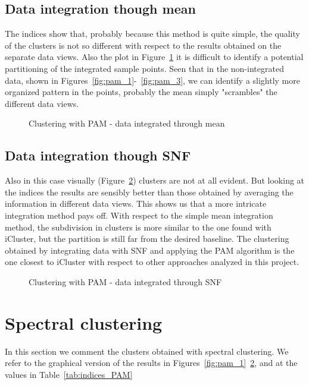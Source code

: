 \subsection{Data integration though mean}\label{pam_mean}
The indices show that, probably because this method is quite simple, the quality of the clusters is not so different with respect to the results obtained on the separate data views. Also the plot in Figure~\ref{fig:pam_mean} it is difficult to identify a potential partitioning of the integrated sample points. Seen that in the non-integrated data, shown in Figures~\ref{fig:pam_1}-~\ref{fig:pam_3}, we can identify a slightly more organized pattern in the points, probably the mean simply "scrambles" the different data views.
\begin{figure}[!]\label{fig:pam_mean}
    \centering
    \caption{Clustering with PAM - data integrated through mean}
\end{figure}

\subsection{Data integration though SNF}\label{pam_SNF}
Also in this case visually (Figure~\ref{fig:pam_SNF}) clusters are not at all evident. But looking at the indices the results are sensibly better than those obtained by averaging the information in different data views. This shows us that a more intricate integration method pays off. With respect to the simple mean integration method, the subdivision in clusters is more similar to the one found with iCluster, but the partition is still far from the desired baseline. The clustering obtained by integrating data with SNF and applying the PAM algorithm is the one closest to iCluster with respect to other approaches analyzed in this project.
\begin{figure}[!]\label{fig:pam_SNF}
    \centering
    \caption{Clustering with PAM - data integrated through SNF}
\end{figure}

\section{Spectral clustering}\label{results_sc}
In this section we comment the clusters obtained with spectral clustering. We refer to the graphical version of the results in Figures~\ref{fig:pam_1}~\ref{fig:pam_SNF}, and at the values in Table~\ref{tab:indices_PAM}


